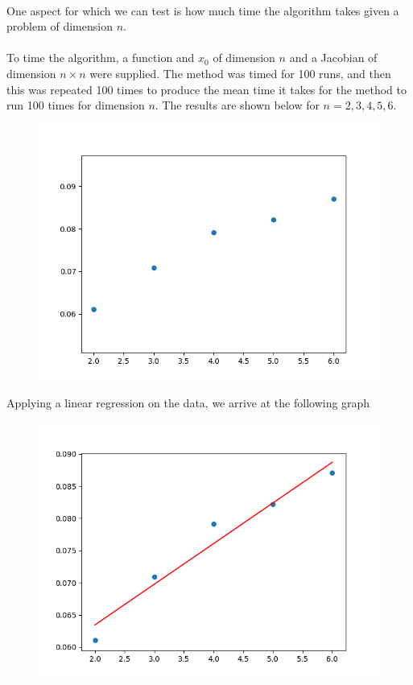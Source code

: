 \documentclass[10pt]{article}
\begin{document}
\\
One aspect for which we can test is how much time the algorithm takes given a problem of dimension $n$.\\
\\
To time the algorithm, a function and $x_{0}$ of dimension $n$ and a Jacobian of dimension $n \times n$  were supplied. The method was timed for 100 runs, and then this was repeated 100 times to produce the mean time it takes for the method to run 100 times for dimension $n$. The results are shown below for $n = 2,3,4,5,6$.
\begin{figure}[H]
\includegraphics[scale=0.4]{newtonRaphsonPerformanceNvsTime.png}
\end{figure}
Applying a linear regression on the data, we arrive at the following graph
\begin{figure}[H]
\includegraphics[scale=0.4]{newtonRaphsonPerformanceNvsTimeWithRegression.png}
\end{figure}
\end{document}
